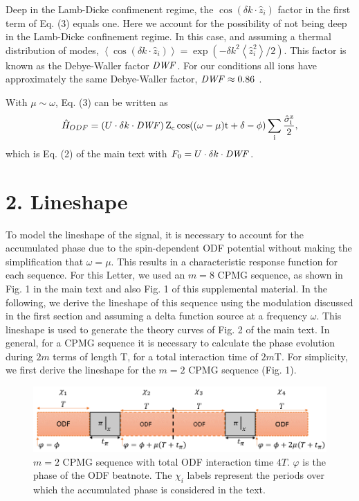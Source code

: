 \documentclass[aps,prl,onecolumn,superscriptaddress,floatfix]{revtex4-1}
\begin{document}
Deep in the Lamb-Dicke confimenent regime, the $\cos(\delta k \cdot \hat{z}_{i})$ factor in the first term of Eq. (3) equals one. Here we account for the possibility of not being deep in the Lamb-Dicke confinement regime. In this case, and assuming a thermal distribution of modes, $\left< \cos(\delta k \cdot \hat{z}_{i}) \right> = \exp(-\delta k^2 \left< \hat{z}^{2}_{i} \right> / 2) $. This factor is known as the Debye-Waller factor $\rm{\it{DWF}}$. For our conditions all ions have approximately the same Debye-Waller factor, $\rm{\it{DWF}} \approx 0.86$ \citep{Bohnet2015}.

With $\mu \sim \omega$, Eq. (3) can be written as
\begin{equation}
\hat{H}_{ODF} = (U \cdot \delta k \cdot \rm{\it{DWF}}) \,  Z_c\cos((\omega - \mu)t + \delta - \phi) \sum_{i} \frac{\hat{\sigma}^{z}_{i}}{2},
\label{}
\end{equation}
which is Eq. (2) of the main text with $F_0 = U \cdot \delta k \cdot \rm{\it{DWF}}$.

\section{2. Lineshape}
To model the lineshape of the signal, it is necessary to account for the accumulated phase due to the spin-dependent ODF potential without making the simplification that $ \omega = \mu $. This results in a characteristic response function for each sequence. For this Letter, we used an $ m = 8 $ CPMG sequence, as shown in Fig. 1 in the main text and also Fig. 1 of this supplemental material. In the following, we derive the lineshape of this sequence using the modulation discussed in the first section and assuming a delta function source at a frequency $\omega$. This lineshape is used to generate the theory curves of Fig. 2 of the main text. In general, for a CPMG sequence it is necessary to calculate the phase evolution during $2m$ terms of length T, for a total interaction time of $2m$T. For simplicity, we first derive the lineshape for the $ m = 2 $ CPMG sequence (Fig. 1).
\begin{figure}
    \centering
    \includegraphics[width=1.0\textwidth]{cpmg_supp}
    \caption{$m = 2$ CPMG sequence with total ODF interaction time $4T$. $\varphi$ is the phase of the ODF beatnote. The $\chi_i$ labels represent the periods over which the accumulated phase is considered in the text.}
    \label{cpmg_sup}
\end{figure}
\end{document}
